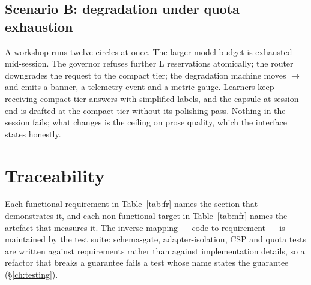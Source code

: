 \subsection{Scenario B: degradation under quota exhaustion}

A workshop runs twelve circles at once. The larger-model budget is exhausted
mid-session. The governor refuses further L reservations atomically; the router
downgrades the request to the compact tier; the degradation machine moves
$\to$ and emits a banner, a telemetry event and a metric gauge.
Learners keep receiving compact-tier answers with simplified labels, and the capsule at
session end is drafted at the compact tier without its polishing pass. Nothing in the
session fails; what changes is the ceiling on prose quality, which the interface states
honestly.

\section{Traceability}

Each functional requirement in Table~\ref{tab:fr} names the section that demonstrates it,
and each non-functional target in Table~\ref{tab:nfr} names the artefact that measures
it. The inverse mapping --- code to requirement --- is maintained by the test suite:
schema-gate, adapter-isolation, CSP and quota tests are written against requirements
rather than against implementation details, so a refactor that breaks a guarantee fails a
test whose name states the guarantee (\S\ref{ch:testing}).

